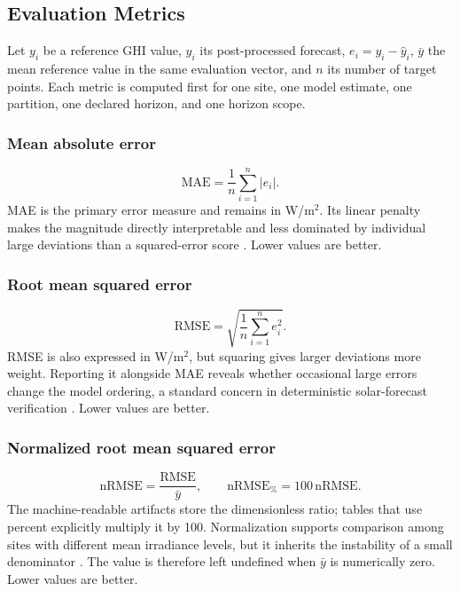 \subsection{Evaluation Metrics}
\label{sec:metrics}

Let $y_i$ be a reference GHI value, $\widehat{y}_i$ its post-processed
forecast, $e_i=y_i-\widehat{y}_i$, $\bar{y}$ the mean reference value in the
same evaluation vector, and $n$ its number of target points. Each metric is
computed first for one site, one model estimate, one partition, one declared
horizon, and one horizon scope.

\subsubsection{Mean absolute error}

\begin{equation}
 \mathrm{MAE}
 =
 \frac{1}{n}\sum_{i=1}^{n}\left|e_i\right|.
 \label{eq:mae}
\end{equation}
MAE is the primary error measure and remains in W/m$^2$. Its linear penalty
makes the magnitude directly interpretable and less dominated by individual
large deviations than a squared-error score \cite{hyndman2006}. Lower values
are better.

\subsubsection{Root mean squared error}

\begin{equation}
 \mathrm{RMSE}
 =
 \sqrt{\frac{1}{n}\sum_{i=1}^{n}e_i^2}.
 \label{eq:rmse}
\end{equation}
RMSE is also expressed in W/m$^2$, but squaring gives larger deviations more
weight. Reporting it alongside MAE reveals whether occasional large errors
change the model ordering, a standard concern in deterministic solar-forecast
verification \cite{yang2020verification}. Lower values are better.

\subsubsection{Normalized root mean squared error}

\begin{equation}
 \mathrm{nRMSE}
 =
 \frac{\mathrm{RMSE}}{\bar{y}},
 \qquad
 \mathrm{nRMSE}_{\%}=100\,\mathrm{nRMSE}.
 \label{eq:nrmse}
\end{equation}
The machine-readable artifacts store the dimensionless ratio; tables that use
percent explicitly multiply it by 100. Normalization supports comparison among
sites with different mean irradiance levels, but it inherits the instability
of a small denominator \cite{voyant2022}. The value is therefore left undefined
when $\bar{y}$ is numerically zero. Lower values are better.


